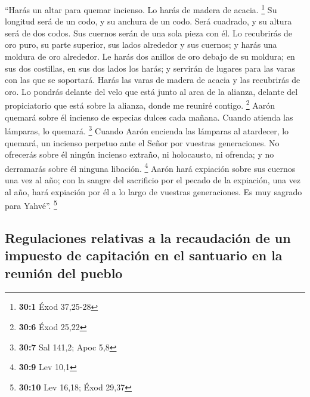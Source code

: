  ``Harás un altar para quemar incienso. Lo harás de madera
de acacia. \footnote{\textbf{30:1} Éxod 37,25-28}  Su
longitud será de un codo, y su anchura de un codo. Será cuadrado, y su
altura será de dos codos. Sus cuernos serán de una sola pieza con él.
 Lo recubrirás de oro puro, su parte superior, sus lados
alrededor y sus cuernos; y harás una moldura de oro alrededor.
 Le harás dos anillos de oro debajo de su moldura; en sus
dos costillas, en sus dos lados los harás; y servirán de lugares para
las varas con las que se soportará.  Harás las varas de
madera de acacia y las recubrirás de oro.  Lo pondrás
delante del velo que está junto al arca de la alianza, delante del
propiciatorio que está sobre la alianza, donde me reuniré contigo.
\footnote{\textbf{30:6} Éxod 25,22}  Aarón quemará sobre
él incienso de especias dulces cada mañana. Cuando atienda las lámparas,
lo quemará. \footnote{\textbf{30:7} Sal 141,2; Apoc 5,8} 
Cuando Aarón encienda las lámparas al atardecer, lo quemará, un incienso
perpetuo ante el Señor por vuestras generaciones.  No
ofrecerás sobre él ningún incienso extraño, ni holocausto, ni ofrenda; y
no derramarás sobre él ninguna libación. \footnote{\textbf{30:9} Lev
  10,1}  Aarón hará expiación sobre sus cuernos una vez
al año; con la sangre del sacrificio por el pecado de la expiación, una
vez al año, hará expiación por él a lo largo de vuestras generaciones.
Es muy sagrado para Yahvé''. \footnote{\textbf{30:10} Lev 16,18; Éxod
  29,37}

\hypertarget{regulaciones-relativas-a-la-recaudaciuxf3n-de-un-impuesto-de-capitaciuxf3n-en-el-santuario-en-la-reuniuxf3n-del-pueblo}{%
\subsection{Regulaciones relativas a la recaudación de un impuesto de
capitación en el santuario en la reunión del
pueblo}\label{regulaciones-relativas-a-la-recaudaciuxf3n-de-un-impuesto-de-capitaciuxf3n-en-el-santuario-en-la-reuniuxf3n-del-pueblo}}


